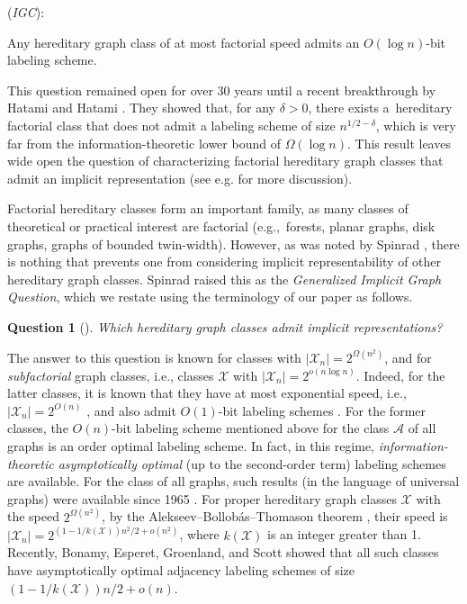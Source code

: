 \documentclass[letterpaper,11pt]{article}
\newcommand{\Ac}{\mathcal{A}}
\newcommand{\Xc}{\mathcal{X}}
\newtheorem{question}{Question}
\theoremstyle{definition}
\theoremstyle{remark}
\begin{document}
	\begin{labeling}{(\textit{IGC}):}
		\item[(\textit{IGC}):] Any hereditary graph class of at most factorial speed admits an $O(\log n)$-bit labeling scheme.
	\end{labeling}
	

	This question remained open for over 30 years until
	a recent breakthrough by Hatami and Hatami \cite{HH22}.
	They showed that, for any $\delta > 0$, there exists a~hereditary factorial class that does not admit a labeling scheme of size $n^{1/2-\delta}$, which is very far from the information-theoretic lower bound of $\Omega(\log n)$.
	This result leaves wide open the question of characterizing factorial hereditary graph classes that admit an implicit representation 
	(see e.g. \cite{HWZ22} for more discussion).
	
	
	Factorial hereditary classes form an important family, as many classes of theoretical or practical interest are factorial (e.g.,~forests, planar graphs, disk graphs, graphs of bounded twin-width). However, as was noted by Spinrad \cite{Spinrad03}, there is nothing that prevents one from considering implicit representability of other hereditary graph classes. Spinrad \cite{Spinrad03} raised this as the \textit{Generalized Implicit Graph Question}, which we restate using the terminology of our paper as follows.
	
	\begin{question}[\cite{Spinrad03}]\label{q:gen-igq}
		Which hereditary graph classes admit implicit representations?
	\end{question}

	The answer to this question is known for classes with $|\Xc_n| = 2^{\Omega(n^2)}$, and for \emph{subfactorial} graph classes, i.e., classes $\Xc$ with $|\Xc_n| = 2^{o(n\log n)}$. Indeed, for the latter classes, it is known that they have at most exponential speed, i.e., $|\Xc_n| = 2^{O(n)}$ \cite{Alekseev97,SZ94}, and also admit $O(1)$-bit labeling schemes \cite{Sch99}.
	For the former classes, the $O(n)$-bit labeling scheme mentioned above for the
	class $\Ac$ of all graphs is an order optimal labeling scheme.
	In fact, in this regime, \emph{information-theoretic asymptotically optimal} (up to the second-order term) labeling schemes are available. For the class of all graphs, such results (in the language of universal graphs) were available since 1965 \cite{moon65,AKTZ15,A17}. 
	For proper hereditary graph classes $\Xc$ with the speed $2^{\Omega(n^2)}$,
	by the Alekseev–Bollobás–Thomason theorem \cite{Ale92,BT95}, their speed is $|\Xc_n| = 2^{(1-1/k(\Xc))n^2/2 + o(n^2)}$, where $k(\Xc)$ is an integer greater than 1. Recently, Bonamy, Esperet, Groenland, and Scott showed \cite{BEGS21} that all such classes have asymptotically optimal adjacency labeling schemes of size $(1-1/k(\Xc))n/2 + o(n)$.
	
\end{document}
